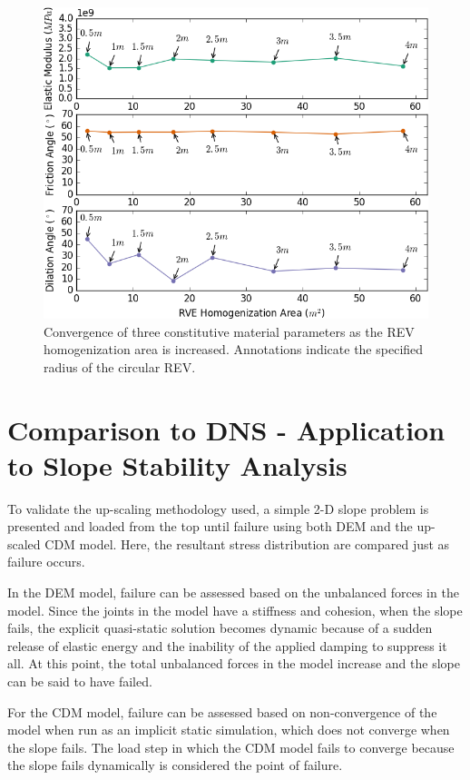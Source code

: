 \begin{figure}[!htb]
\begin{center}
\includegraphics[width=\textwidth]{figures/REVAnalysis/REVAnalysis}
\caption{{\label{fig:revconverge} Convergence of three constitutive material parameters as the REV homogenization area is increased. Annotations indicate the specified radius of the circular REV.%
}}
\end{center}
\end{figure}

\section{Comparison to DNS - Application to Slope Stability Analysis}

To validate the up-scaling methodology used, a simple 2-D slope problem is presented and loaded from the top until failure using both DEM and the up-scaled CDM model. Here, the resultant stress distribution are compared just as failure occurs. 

In the DEM model, failure can be assessed based on the unbalanced forces in the model. Since the joints in the model have a stiffness and cohesion, when the slope fails, the explicit quasi-static solution becomes dynamic because of a sudden release of elastic energy and the inability of the applied damping to suppress it all. At this point, the total unbalanced forces in the model increase and the slope can be said to have failed. 

For the CDM model, failure can be assessed based on non-convergence of the model when run as an implicit static simulation, which does not converge when the slope fails. The load step in which the CDM model fails to converge because the slope fails dynamically is considered the point of failure.


